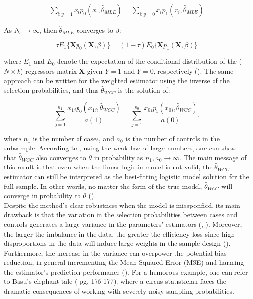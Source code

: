 \begin{align}
    \sum_{i:y=1} x_i p_0(x_i,  \hat{\theta}_{MLE}) = \sum_{i: y=0} x_i p_1(x_i,  \hat{\theta}_{MLE})
\end{align}

As $N_s \rightarrow \infty$, then $\hat{\theta}_{MLE}$ converges to $\beta$:

\begin{equation}
    \tau E_1 \{\mathbf{X} p_0(\mathbf{X}, \beta)\} = (1 - \tau) E_0 \{\mathbf{X} p_1(\mathbf{X}, \beta)\}
    \label{eqn:wcc-convergence}
\end{equation}

where $E_1$ and $E_0$ denote the expectation of the conditional distribution of the ($N \times k$) regressors matrix $\mathbf{X}$ given $Y=1$ and $Y=0$, respectively (\cite{scott1986}). The same approach can be written for the weighted estimator using the inverse of the selection probabilities, and thus $\hat{\theta}_{WCC}$ is the solution of:

\begin{equation}
    \sum_{j=1}^{n_1} \frac{x_{1j} p_0(x_{1j},  \hat{\theta}_{WCC})}{a(1)} = \sum_{j=1}^{n_0} \frac{x_{0j} p_1(x_{0j},  \hat{\theta}_{WCC})}{a(0)}.
\end{equation}

where $n_1$ is the number of cases, and $n_0$ is the number of controls in the subsample. According to \textcite{scott1986}, using the weak law of large numbers, one can show that $\hat{\theta}_{WCC}$ also converges to $\theta$ in probability as $n_1, n_0 \rightarrow \infty$. The main message of this result is that even when the linear logistic model is not valid, the $\hat{\theta}_{WCC}$ estimator can still be interpreted as the best-fitting logistic model solution for the full sample. In other words, no matter the form of the true model, $\hat{\theta}_{WCC}$ will converge in probability to $\theta$ (\cite{scott1986}). \\

Despite the method's clear robustness when the model is misspecified, its main drawback is that the variation in the selection probabilities between cases and controls generates a large variance in the parameters' estimators  (\cite{scott2002}, \cite{li2011}). Moreover, the larger the imbalance in the data, the greater the efficiency loss since high disproportions in the data will induce large weights in the sample design (\cite{elliott2000}). Furthermore, the increase in the variance can overpower the potential bias reduction, in general incrementing the Mean Squared Error (MSE) and harming the estimator's prediction performance (\cite{elliott2000}). For a humorous example, one can refer to Basu's elephant tale (\cite{basu1971} pg. 176-177), where a circus statistician faces the dramatic consequences of working with severely noisy sampling probabilities. 





